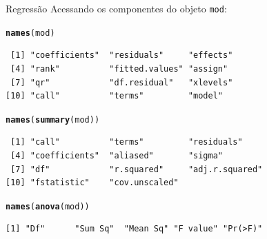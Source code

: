 \documentclass[10pt]{beamer}\usepackage[]{graphicx}\usepackage[]{color}
\makeatletter
\newcommand{\hlstd}[1]{\textcolor[rgb]{0.345,0.345,0.345}{#1}}%
\newcommand{\hlkwd}[1]{\textcolor[rgb]{0.737,0.353,0.396}{\textbf{#1}}}%
\newenvironment{kframe}{%
 \def\at@end@of@kframe{}%
 \ifinner\ifhmode%
  \def\at@end@of@kframe{\end{minipage}}%
  \begin{minipage}{\columnwidth}%
 \fi\fi%
 \def\FrameCommand##1{\hskip\@totalleftmargin \hskip-\fboxsep
 \colorbox{shadecolor}{##1}\hskip-\fboxsep
     \hskip-\linewidth \hskip-\@totalleftmargin \hskip\columnwidth}%
 \MakeFramed {\advance\hsize-\width
   \@totalleftmargin\z@ \linewidth\hsize
   \@setminipage}}%
 {\par\unskip\endMakeFramed%
 \at@end@of@kframe}
\newenvironment{knitrout}{}{} %
\theoremstyle{definition}
\makeatother
\begin{document}
\begin{frame}[fragile=singleslide]{Regressão}
Acessando os componentes do objeto \texttt{mod}:
\begin{knitrout}\small
{}\color{fgcolor}\begin{kframe}
\begin{alltt}
\hlkwd{names}\hlstd{(mod)}
\end{alltt}
\begin{verbatim}
 [1] "coefficients"  "residuals"     "effects"      
 [4] "rank"          "fitted.values" "assign"       
 [7] "qr"            "df.residual"   "xlevels"      
[10] "call"          "terms"         "model"        
\end{verbatim}
\begin{alltt}
\hlkwd{names}\hlstd{(}\hlkwd{summary}\hlstd{(mod))}
\end{alltt}
\begin{verbatim}
 [1] "call"          "terms"         "residuals"    
 [4] "coefficients"  "aliased"       "sigma"        
 [7] "df"            "r.squared"     "adj.r.squared"
[10] "fstatistic"    "cov.unscaled" 
\end{verbatim}
\begin{alltt}
\hlkwd{names}\hlstd{(}\hlkwd{anova}\hlstd{(mod))}
\end{alltt}
\begin{verbatim}
[1] "Df"      "Sum Sq"  "Mean Sq" "F value" "Pr(>F)" 
\end{verbatim}
\end{kframe}
\end{knitrout}
\end{frame}
\end{document}
